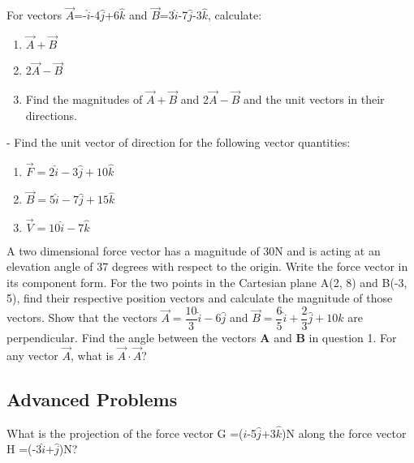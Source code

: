 \documentclass[9pt,addpoints]{exam}
\begin{document}
	\begin{questions}
		\question For vectors  $\vec{A}$=-$\hat{i}$-4$\hat{j}$+6$\hat{k}$ and $\vec{B}$=3$\hat{i}$-7$\hat{j}$-3$\hat{k}$, calculate:
		\begin{enumerate}[label=(\Alph*)]
			\item $\vec{A}+\vec{B}$ 
			\item 2$\vec{A}-\vec{B}$
			\item Find the magnitudes of $\vec{A}+\vec{B}$ and 2$\vec{A}-\vec{B}$ and the unit vectors in their directions.
		\end{enumerate}
-		\question Find the unit vector of direction for the following vector quantities:
		\begin{enumerate}[label=(\Roman*)]
			\item ${\vec{F}}=2\hat{i}-3\hat{j}+10\hat{k}$
			\item ${\vec{B}}=5\hat{i}-7\hat{j}+15\hat{k}$
			\item ${\vec{V}}=10\hat{i}-7\hat{k}$
		\end{enumerate}
		\question A two dimensional force vector has a magnitude of 30N and is acting at an elevation angle of 37 degrees with respect to the origin. Write the force vector in its component form. 
		\question For the two points in the Cartesian plane A(2, 8) and B(-3, 5), find their respective position vectors and calculate the magnitude of those vectors.
		\question Show that the vectors $\vec{A}=\dfrac{10}{3}\hat{i}-6\hat{j}$ and $\vec{B}=\dfrac{6}{5}\hat{i}+\dfrac{2}{3}\hat{j}+10\hat{k}$ are perpendicular.
		\question Find the angle between the vectors \textbf{A} and \textbf{B} in question 1.
		\question For any vector $\vec{A}$, what is $\vec{A}\cdot\vec{A}$?
		\subsection*{Advanced Problems}
		\question What is the projection of the force vector  G =($\hat{i}$-5$\hat{j}$+3$\hat{k}$)N along the force vector  H =(-3$\hat{i}$+$\hat{j}$)N?
	\end{questions}		
\end{document}
